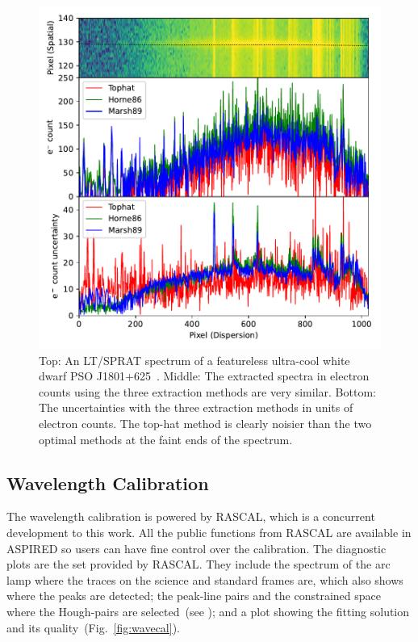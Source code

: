 \documentclass[fleqn,usenatbib]{mnras}
\begin{document}
\begin{figure}
    \centering
    \includegraphics[width=\columnwidth]{fig_04_extraction_compared.pdf}
    \caption{Top: An LT/SPRAT spectrum of a featureless ultra-cool white dwarf PSO J1801+625~\citep{2020MNRAS.493.6001L}.
    Middle: The extracted spectra in electron counts using the three extraction methods
    are very similar. Bottom: The uncertainties with the three extraction methods
    in units of electron counts. The
    top-hat method is clearly noisier than the two optimal methods at the faint ends of the spectrum.}
    \label{fig:extraction_compared}
\end{figure}

\subsection{Wavelength Calibration}
The wavelength calibration is powered by \textsc{RASCAL}, which
is a concurrent development to this work. All the public
functions from \textsc{RASCAL} are available in \textsc{ASPIRED}
so users can have fine control over the calibration. The
diagnostic plots are the set provided by \textsc{RASCAL}.
They include the spectrum of the arc lamp where the traces
on the science and standard frames are, which also shows where
the peaks are detected; the peak-line pairs and the constrained
space where the Hough-pairs are
selected~(see \citealt{2020ASPC..527..627V}); and a plot showing
the fitting solution and its quality~(Fig.~\ref{fig:wavecal}).
\end{document}
